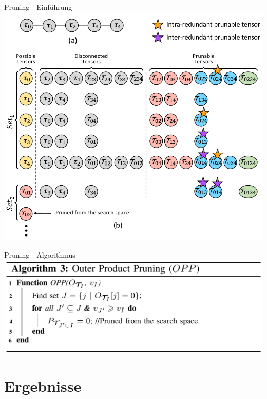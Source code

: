 \documentclass{beamer}
\begin{document}
\begin{frame}{Pruning - Einführung}
	\includegraphics[scale=0.25]{figure-6}
\end{frame}
\begin{frame}{Pruning - Algorithmus}
	\includegraphics[scale=0.25]{algorithm-3}
\end{frame}
\section{Ergebnisse}
\end{document}
